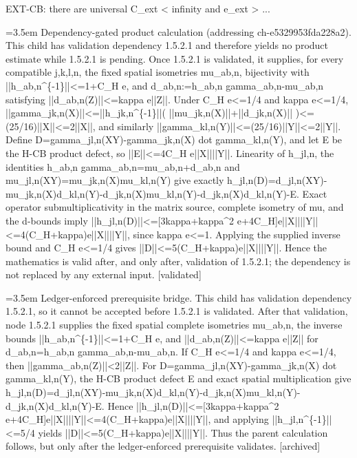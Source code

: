 \documentclass{article}
\newcommand{\step}[1]{\par\noindent\hangindent=3.5em\hangafter=1%
  \makebox[3.5em][l]{\textbf{#1.}}}
\newcommand{\steptag}[1]{\hfill{\small\textsf{[#1]}}}
\begin{document}
\begin{proofbox}{EXT-CB: there are universal C\_ext < infinity and e\_ext > ...}
\step{1.5.2.2.1} Dependency-gated product calculation (addressing ch-e5329953fda228a2). This child has validation dependency 1.5.2.1 and therefore yields no product estimate while 1.5.2.1 is pending. Once 1.5.2.1 is validated, it supplies, for every compatible j,k,l,n, the fixed spatial isometries mu\_ab,n, bijectivity with ||h\_ab,n\textasciicircum{}\{-1\}||<=1+C\_H e, and d\_ab,n:=h\_ab,n gamma\_ab,n-mu\_ab,n satisfying ||d\_ab,n(Z)||<=kappa e||Z||. Under C\_H e<=1/4 and kappa e<=1/4, ||gamma\_jk,n(X)||<=||h\_jk,n\textasciicircum{}\{-1\}||( ||mu\_jk,n(X)||+||d\_jk,n(X)|| )<=(25/16)||X||<=2||X||, and similarly ||gamma\_kl,n(Y)||<=(25/16)||Y||<=2||Y||. Define D=gamma\_jl,n(XY)-gamma\_jk,n(X) dot gamma\_kl,n(Y), and let E be the H-CB product defect, so ||E||<=4C\_H e||X||||Y||. Linearity of h\_jl,n, the identities h\_ab,n gamma\_ab,n=mu\_ab,n+d\_ab,n and mu\_jl,n(XY)=mu\_jk,n(X)mu\_kl,n(Y) give exactly h\_jl,n(D)=d\_jl,n(XY)-mu\_jk,n(X)d\_kl,n(Y)-d\_jk,n(X)mu\_kl,n(Y)-d\_jk,n(X)d\_kl,n(Y)-E. Exact operator submultiplicativity in the matrix source, complete isometry of mu, and the d-bounds imply ||h\_jl,n(D)||<=[3kappa+kappa\textasciicircum{}2 e+4C\_H]e||X||||Y||<=4(C\_H+kappa)e||X||||Y||, since kappa e<=1. Applying the supplied inverse bound and C\_H e<=1/4 gives ||D||<=5(C\_H+kappa)e||X||||Y||. Hence the mathematics is valid after, and only after, validation of 1.5.2.1; the dependency is not replaced by any external input. \steptag{validated} \\[6pt]
\step{1.5.2.2.1.1} Ledger-enforced prerequisite bridge. This child has validation dependency 1.5.2.1, so it cannot be accepted before 1.5.2.1 is validated. After that validation, node 1.5.2.1 supplies the fixed spatial complete isometries mu\_ab,n, the inverse bounds ||h\_ab,n\textasciicircum{}\{-1\}||<=1+C\_H e, and ||d\_ab,n(Z)||<=kappa e||Z|| for d\_ab,n=h\_ab,n gamma\_ab,n-mu\_ab,n. If C\_H e<=1/4 and kappa e<=1/4, then ||gamma\_ab,n(Z)||<2||Z||. For D=gamma\_jl,n(XY)-gamma\_jk,n(X) dot gamma\_kl,n(Y), the H-CB product defect E and exact spatial multiplication give h\_jl,n(D)=d\_jl,n(XY)-mu\_jk,n(X)d\_kl,n(Y)-d\_jk,n(X)mu\_kl,n(Y)-d\_jk,n(X)d\_kl,n(Y)-E. Hence ||h\_jl,n(D)||<=[3kappa+kappa\textasciicircum{}2 e+4C\_H]e||X||||Y||<=4(C\_H+kappa)e||X||||Y||, and applying ||h\_jl,n\textasciicircum{}\{-1\}||<=5/4 yields ||D||<=5(C\_H+kappa)e||X||||Y||. Thus the parent calculation follows, but only after the ledger-enforced prerequisite validates. \steptag{archived} \\[4pt]

\end{proofbox}
\end{document}
